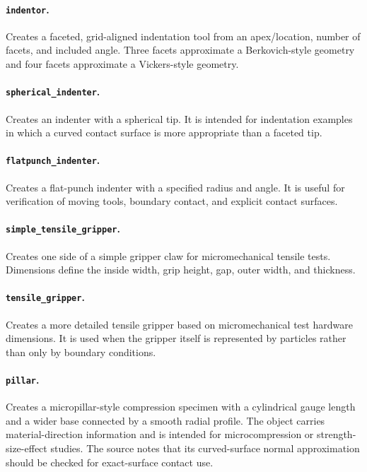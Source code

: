 \paragraph{\texttt{indentor}.}Creates a faceted, grid-aligned indentation tool from an apex/location, number of facets, and included angle.  Three facets approximate a Berkovich-style geometry and four facets approximate a Vickers-style geometry.

\paragraph{\texttt{spherical\_indenter}.}Creates an indenter with a spherical tip.  It is intended for indentation examples in which a curved contact surface is more appropriate than a faceted tip.

\paragraph{\texttt{flatpunch\_indenter}.}Creates a flat-punch indenter with a specified radius and angle.  It is useful for verification of moving tools, boundary contact, and explicit contact surfaces.

\paragraph{\texttt{simple\_tensile\_gripper}.}Creates one side of a simple gripper claw for micromechanical tensile tests.  Dimensions define the inside width, grip height, gap, outer width, and thickness.

\paragraph{\texttt{tensile\_gripper}.}Creates a more detailed tensile gripper based on micromechanical test hardware dimensions.  It is used when the gripper itself is represented by particles rather than only by boundary conditions.

\paragraph{\texttt{pillar}.}Creates a micropillar-style compression specimen with a cylindrical gauge length and a wider base connected by a smooth radial profile.  The object carries material-direction information and is intended for microcompression or strength-size-effect studies.  The source notes that its curved-surface normal approximation should be checked for exact-surface contact use.

